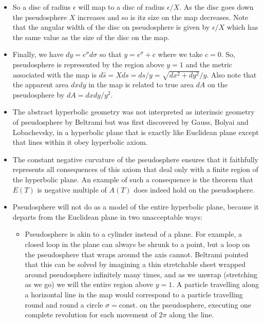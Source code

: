 \documentclass[12pt]{article}
\begin{document}
\begin{itemize}
    \item So a disc of radius $\epsilon$ will map to a disc of radius $\epsilon/X$. As the disc goes down the pseudosphere $X$ increases and so is itz size on the map decreases. Note that the angular width of the disc on pseudosphere is given by $\epsilon/X$ which has the same value as the size of the disc on the map.
    
    \item Finally, we have $dy=e^{\sigma}d\sigma$ so that $y=e^{\sigma}+c$ where we take $c=0$. So, pseudosphere is represented by the region above $y=1$ and the metric associated with the map is $d\hat{s}=Xds=ds/y = \sqrt{dx^2+dy^2}/y$. Also note that the apparent area $dxdy$ in the map is related to true area $dA$ on the pseudosphere by $dA=dxdy/y^2$.
    
    \item The abstract hyperbolic geometry was not interpreted as interinsic geometry of pseudosphere by Beltrami but was first discovered by Gauss, Bolyai and Lobachevsky, in a hyperbolic plane that is exactly like Euclidean plane except that lines within it obey hyperbolic axiom.

    \item The constant negative curvature of the pseudosphere ensures that it faithfully represents all consequences of this axiom that deal only with a finite region of the hyperbolic plane. An example of such a consequence is the theorem that $E(T)$ is negative multiple of $A(T)$ does indeed hold on the pseudosphere.

    \item Pseudosphere will not do as a model of the entire hyperbolic plane, because it departs from the Euclidean plane in two unacceptable ways:
    
    \begin{itemize}
        \item Pseudosphere is akin to a cylinder instead of a plane. For example, a closed loop in the plane can always be shrunk to a point, but a loop on the pseudosphere that wraps around the axis cannot. Beltrami pointed that this can be solved by imagining a thin stretchable sheet wrapped around pseudosphere infinitely many times, and as we unwrap (stretching as we go) we will the entire region above $y=1$. A particle travelling along a horizontal line in the map would correspond to a particle travelling round and round a circle $\sigma=$const. on the pseudosphere, executing one complete revolution for each movement of $2\pi$ along the line.


\end{itemize}
\end{itemize}
\end{document}

